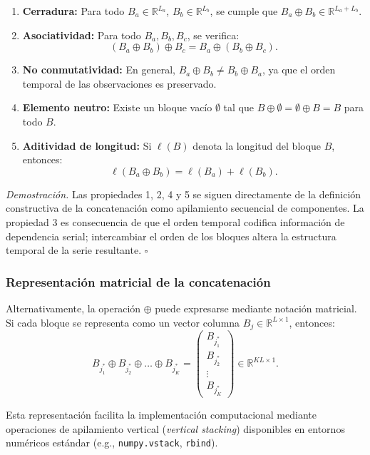 \documentclass[
  spanish,
  us-letterpaper,
]{scrreprt}
\numberwithin{equation}{section}
\begin{document}
\begin{enumerate}
\def\labelenumi{\arabic{enumi}.}
\item
  \textbf{Cerradura:} Para todo \(B_a \in \mathbb{R}^{L_a}\),
  \(B_b \in \mathbb{R}^{L_b}\), se cumple que
  \(B_a \oplus B_b \in \mathbb{R}^{L_a + L_b}\).
\item
  \textbf{Asociatividad:} Para todo \(B_a, B_b, B_c\), se verifica: \[
  (B_a \oplus B_b) \oplus B_c = B_a \oplus (B_b \oplus B_c).
  \]
\item
  \textbf{No conmutatividad:} En general,
  \(B_a \oplus B_b \neq B_b \oplus B_a\), ya que el orden temporal de
  las observaciones es preservado.
\item
  \textbf{Elemento neutro:} Existe un bloque vacío \(\emptyset\) tal que
  \(B \oplus \emptyset = \emptyset \oplus B = B\) para todo \(B\).
\item
  \textbf{Aditividad de longitud:} Si \(\ell(B)\) denota la longitud del
  bloque \(B\), entonces: \[
  \ell(B_a \oplus B_b) = \ell(B_a) + \ell(B_b).
  \]
\end{enumerate}

\emph{Demostración.} Las propiedades 1, 2, 4 y 5 se siguen directamente
de la definición constructiva de la concatenación como apilamiento
secuencial de componentes. La propiedad 3 es consecuencia de que el
orden temporal codifica información de dependencia serial; intercambiar
el orden de los bloques altera la estructura temporal de la serie
resultante. \(\square\)

\subsubsection{Representación matricial de la
concatenación}\label{representaciuxf3n-matricial-de-la-concatenaciuxf3n}

Alternativamente, la operación \(\oplus\) puede expresarse mediante
notación matricial. Si cada bloque se representa como un vector columna
\(B_j \in \mathbb{R}^{L \times 1}\), entonces: \[
B_{j_1^*} \oplus B_{j_2^*} \oplus \dots \oplus B_{j_K^*} = \begin{pmatrix} B_{j_1^*} \\ B_{j_2^*} \\ \vdots \\ B_{j_K^*} \end{pmatrix} \in \mathbb{R}^{KL \times 1}.
\]

Esta representación facilita la implementación computacional mediante
operaciones de apilamiento vertical (\emph{vertical stacking})
disponibles en entornos numéricos estándar (e.g., \texttt{numpy.vstack},
\texttt{rbind}).
\end{document}
